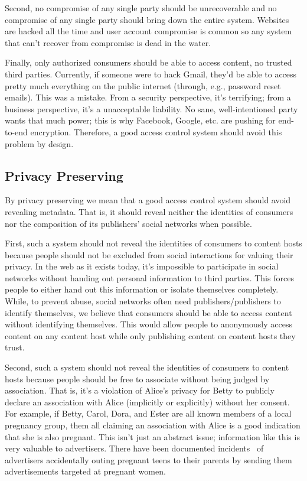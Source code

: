 \documentclass[pdftex,12pt,a4papaer]{report}
\begin{document}
Second, no compromise of any single party should be unrecoverable and no
compromise of any single party should bring down the entire system. Websites are
hacked all the time and user account compromise is common so any system that
can't recover from compromise is dead in the water.

Finally, only authorized consumers should be able to access content, no trusted
third parties. Currently, if someone were to hack Gmail, they'd be able to
access pretty much everything on the public internet (through, e.g., password
reset emails). This was a mistake. From a security perspective, it's terrifying;
from a business perspective, it's a unacceptable liability. No sane,
well-intentioned party wants that much power; this is why Facebook, Google, etc.
are pushing for end-to-end encryption. Therefore, a good access control system
should avoid this problem by design.

\subsection{Privacy Preserving}

By privacy preserving we mean that a good access control system should avoid
revealing metadata. That is, it should reveal neither the identities of
consumers nor the composition of its publishers' social networks when possible.

First, such a system should not reveal the identities of consumers to content
hosts because people should not be excluded from social interactions for valuing
their privacy. In the web as it exists today, it's impossible to participate in
social networks without handing out personal information to third parties. This
forces people to either hand out this information or isolate themselves
completely. While, to prevent abuse, social networks often need
publishers/publishers to identify themselves, we believe that consumers should
be able to access content without identifying themselves. This would allow
people to anonymously access content on any content host while only publishing
content on content hosts they trust.

Second, such a system should not reveal the identities of consumers to content
hosts because people should be free to associate without being judged by
association. That is, it's a violation of Alice's privacy for Betty to publicly
declare an association with Alice (implicitly or explicitly) without her
consent. For example, if Betty, Carol, Dora, and Ester are all known members of
a local pregnancy group, them all claiming an association with Alice is a good
indication that she is also pregnant. This isn't just an abstract issue;
information like this is very valuable to advertisers. There have been
documented incidents~\cite{target} of advertisers accidentally outing pregnant
teens to their parents by sending them advertisements targeted at pregnant
women.
\end{document}
